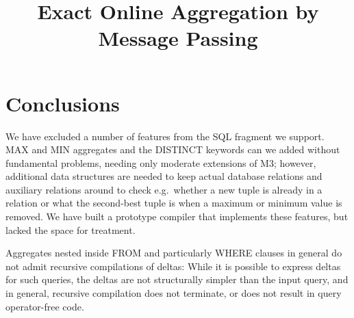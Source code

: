 \documentclass{sig-alternate}
\title{Exact Online Aggregation by Message Passing}
\author{}%
\begin{document}
\maketitle










\section{Conclusions}
\label{sec:conclusions}


We have excluded a number of features from the SQL fragment we support.
MAX and MIN aggregates and the DISTINCT keywords can we added without
fundamental problems, needing only moderate extensions of M3; however,
additional data structures are needed to keep actual database relations
and auxiliary relations
around to check e.g.\ whether a new tuple is already in a relation or what the
second-best tuple is when a maximum or minimum value is removed. We
have built a prototype compiler that implements these features, but lacked the
space for treatment.

Aggregates nested inside FROM and particularly WHERE clauses in general
do not admit recursive compilations of deltas: While it is possible to express
deltas for such queries, the deltas are not structurally simpler than the
input query, and in general, recursive compilation does not terminate,
or does not result in query operator-free code.
\end{document}

